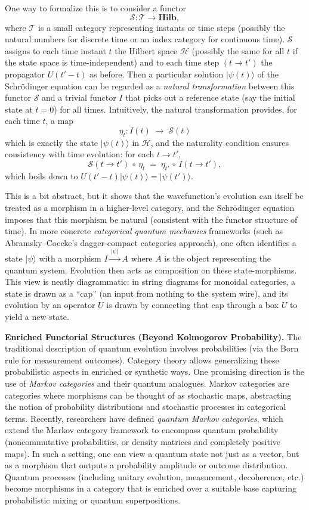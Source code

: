 \documentclass[12pt]{article}
\begin{document}
One way to formalize this is to consider a functor 
\[
   \mathcal{S}: \mathcal{T} \to \mathbf{Hilb},
\]
where $\mathcal{T}$ is a small category representing instants or time steps (possibly the natural numbers for discrete time or an index category for continuous time). $\mathcal{S}$ assigns to each time instant $t$ the Hilbert space $\mathcal{H}$ (possibly the same for all $t$ if the state space is time-independent) and to each time step $(t \to t')$ the propagator $U(t'-t)$ as before. Then a particular solution $\lvert \psi(t)\rangle$ of the Schrödinger equation can be regarded as a \emph{natural transformation} between this functor $\mathcal{S}$ and a trivial functor $I$ that picks out a reference state (say the initial state at $t=0$) for all times. Intuitively, the natural transformation provides, for each time $t$, a map 
\[
   \eta_t: I(t) \; \longrightarrow \; \mathcal{S}(t)
\]
which is exactly the state $\lvert\psi(t)\rangle$ in $\mathcal{H}$, and the naturality condition ensures consistency with time evolution: for each $t \to t'$, 
\[
   \mathcal{S}(t \to t') \,\circ\, \eta_t 
   \;=\; \eta_{t'} \,\circ\, I(t \to t'),
\]
which boils down to $U(t'-t) \lvert\psi(t)\rangle = \lvert\psi(t')\rangle$.

This is a bit abstract, but it shows that the wavefunction’s evolution can itself be treated as a morphism in a higher-level category, and the Schrödinger equation imposes that this morphism be natural (consistent with the functor structure of time). In more concrete \emph{categorical quantum mechanics} frameworks (such as Abramsky--Coecke’s dagger-compact categories approach), one often identifies a state $\lvert\psi\rangle$ with a morphism $I \xrightarrow{\,|\psi\rangle\,} A$ where $A$ is the object representing the quantum system. Evolution then acts as composition on these state-morphisms. This view is neatly diagrammatic: in string diagrams for monoidal categories, a state is drawn as a ``cap'' (an input from nothing to the system wire), and its evolution by an operator $U$ is drawn by connecting that cap through a box $U$ to yield a new state.

\medskip
\textbf{Enriched Functorial Structures (Beyond Kolmogorov Probability).} The traditional description of quantum evolution involves probabilities (via the Born rule for measurement outcomes). Category theory allows generalizing these probabilistic aspects in enriched or synthetic ways. One promising direction is the use of \emph{Markov categories} and their quantum analogues. Markov categories are categories where morphisms can be thought of as stochastic maps, abstracting the notion of probability distributions and stochastic processes in categorical terms. Recently, researchers have defined \emph{quantum Markov categories}, which extend the Markov category framework to encompass quantum probability (noncommutative probabilities, or density matrices and completely positive maps). In such a setting, one can view a quantum state not just as a vector, but as a morphism that outputs a probability amplitude or outcome distribution. Quantum processes (including unitary evolution, measurement, decoherence, etc.) become morphisms in a category that is enriched over a suitable base capturing probabilistic mixing or quantum superpositions.
\end{document}
